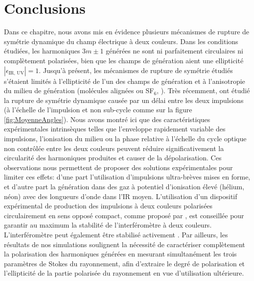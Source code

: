 \section*{Conclusions}
Dans ce chapitre, nous avons mis en évidence plusieurs mécanismes de rupture de symétrie dynamique du champ électrique à deux couleurs. Dans les conditions étudiées, les harmoniques $3m \pm 1$ générées ne sont ni parfaitement circulaires ni complètement polarisées, bien que les champs de génération aient une ellipticité $|\epsilon_{\text{IR, UV}}| = 1$. Jusqu'à présent, les mécanismes de rupture de symétrie étudiés s'étaient limités à l'ellipticité de l'un des champs de génération   et à l'anisotropie du milieu de génération (molécules alignées ou SF$_6$, ). Très récemment,  ont étudié la rupture de symétrie dynamique causée par un délai entre les deux impulsions (à l'échelle de l'impulsion et non sub-cycle comme sur la figure \ref{fig:MoyenneAngles}). Nous avons montré ici que des caractéristiques expérimentales intrinsèques telles que l'enveloppe rapidement variable des impulsions, l'ionisation du milieu ou la phase relative à l'échelle du cycle optique non contrôlée entre les deux couleurs peuvent réduire significativement la circularité des harmoniques produites et causer de la dépolarisation. Ces observations nous permettent de proposer des solutions expérimentales pour limiter ces effets: d'une part l'utilisation d'impulsions ultra-brèves mises en forme, et d'autre part la génération dans des gaz à potentiel d'ionisation élevé (hélium, néon) avec des longueurs d'onde dans l'IR moyen. L'utilisation d'un dispositif expérimental de production des impulsions à deux couleurs polarisées circulairement en sens opposé compact, comme proposé par , est conseillée pour garantir au maximum la stabilité de l'interféromètre à deux couleurs. L'interféromètre peut également être stabilisé activement . Par ailleurs, les résultats de nos simulations soulignent la nécessité de caractériser complètement la polarisation des harmoniques générées en mesurant simultanément les trois paramètres de Stokes du rayonnement, afin d'extraire le degré de polarisation et l'ellipticité de la partie polarisée du rayonnement en vue d'utilisation ultérieure.






